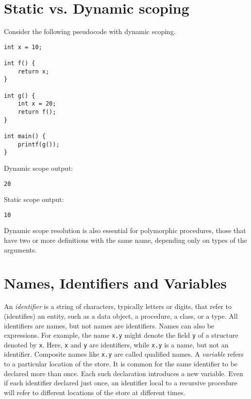 \documentclass[12pt,a4paper,oneside,draft]{report}
\newcommand{\cc}[1]{\texttt{#1}}
\begin{document}
\newpage

\section*{Static vs. Dynamic scoping}

\lstset{style=clanguage}
Consider the following pseudocode with dynamic scoping.
\begin{lstlisting}
int x = 10;

int f() {
	return x;
}

int g() {
	int x = 20;
	return f();
}
 
int main() {
	printf(g());
}
\end{lstlisting}

\lstset{style=codeoutput}
\noindent Dynamic scope output:
\begin{lstlisting}
20
\end{lstlisting}

\lstset{style=codeoutput}
\noindent Static scope output:
\begin{lstlisting}
10
\end{lstlisting}

Dynamic scope resolution is also essential for polymorphic procedures, those that have two or more definitions with the same name, depending only on types of the arguments.

\section*{Names, Identifiers and Variables}
\indent\indent An \emph{identifier} is a string of characters, typically letters or digits, that refer to (identifies) an entity, such as a data object, a procedure, a class, or a type. All identifiers are names, but not names are identifiers. Names can also be expressions. For example, the name \cc{x.y} might denote the field \cc{y} of a structure denoted by \cc{x}. Here, \cc{x} and \cc{y} are identifiers, while \cc{x.y} is a name, but not an identifier. Composite names like \cc{x.y} are called qualified names.
\indent A \emph{variable} refers to a particular location of the store. It is common for the same identifier to be declared more than once. Each such declaration introduces a new variable. Even if each identifier declared just once, an identifier local to a recursive procedure will refer to different locations of the store at different times.
\end{document}
